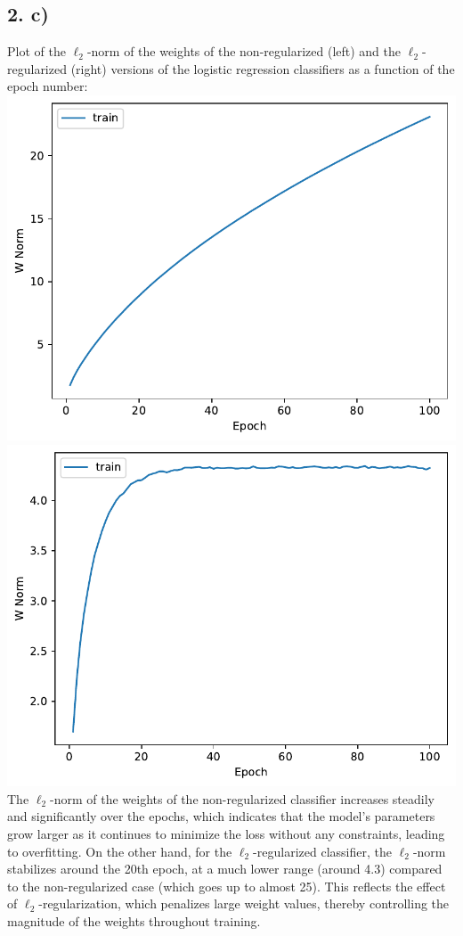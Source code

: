 \documentclass[12pt,a4paper]{article}
\begin{document}
    \subsection{2. c)}
        Plot of the \(\ell_2\)-norm of the weights of the non-regularized (left) and the \(\ell_2\)-regularized (right) versions of the logistic regression classifiers as a function of the epoch number: \\
        \includegraphics[width=\imagewidth]{q1/q1_2a-w_norms.pdf}
        \includegraphics[width=\imagewidth]{q1/q1_2b-w_norms.pdf} \\
        The \(\ell_2\)-norm of the weights of the non-regularized classifier increases steadily and significantly over the epochs, which indicates that the model's parameters grow larger as it continues to minimize the loss without any constraints, leading to overfitting. On the other hand, for the \(\ell_2\)-regularized classifier, the \(\ell_2\)-norm stabilizes around the 20th epoch, at a much lower range (around 4.3) compared to the non-regularized case (which goes up to almost 25). This reflects the effect of \(\ell_2\)-regularization, which penalizes large weight values, thereby controlling the magnitude of the weights throughout training.
\end{document}
